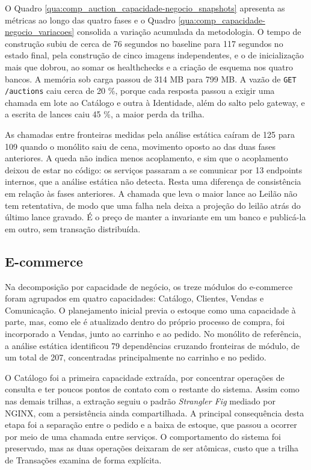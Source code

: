 O Quadro \ref{qua:comp_auction_capacidade-negocio_snapshots} apresenta as métricas ao longo das quatro fases e o Quadro \ref{qua:comp_capacidade-negocio_variacoes} consolida a variação acumulada da metodologia. O tempo de construção subiu de cerca de 76 segundos no baseline para 117 segundos no estado final, pela construção de cinco imagens independentes, e o de inicialização mais que dobrou, ao somar os healthchecks e a criação de esquema nos quatro bancos. A memória sob carga passou de 314 MB para 799 MB. A vazão de \texttt{GET /auctions} caiu cerca de 20 \%, porque cada resposta passou a exigir uma chamada em lote ao Catálogo e outra à Identidade, além do salto pelo gateway, e a escrita de lances caiu 45 \%, a maior perda da trilha.

As chamadas entre fronteiras medidas pela análise estática caíram de 125 para 109 quando o monólito saiu de cena, movimento oposto ao das duas fases anteriores. A queda não indica menos acoplamento, e sim que o acoplamento deixou de estar no código: os serviços passaram a se comunicar por 13 endpoints internos, que a análise estática não detecta. Resta uma diferença de consistência em relação às fases anteriores. A chamada que leva o maior lance ao Leilão não tem retentativa, de modo que uma falha nela deixa a projeção do leilão atrás do último lance gravado. É o preço de manter a invariante em um banco e publicá-la em outro, sem transação distribuída.



\subsection*{E-commerce}

Na decomposição por capacidade de negócio, os treze módulos do e-commerce foram agrupados em quatro capacidades: Catálogo, Clientes, Vendas e Comunicação. O planejamento inicial previa o estoque como uma capacidade à parte, mas, como ele é atualizado dentro do próprio processo de compra, foi incorporado a Vendas, junto ao carrinho e ao pedido. No monólito de referência, a análise estática identificou 79 dependências cruzando fronteiras de módulo, de um total de 207, concentradas principalmente no carrinho e no pedido.

O Catálogo foi a primeira capacidade extraída, por concentrar operações de consulta e ter poucos pontos de contato com o restante do sistema. Assim como nas demais trilhas, a extração seguiu o padrão \textit{Strangler Fig} mediado por NGINX, com a persistência ainda compartilhada. A principal consequência desta etapa foi a separação entre o pedido e a baixa de estoque, que passou a ocorrer por meio de uma chamada entre serviços. O comportamento do sistema foi preservado, mas as duas operações deixaram de ser atômicas, custo que a trilha de Transações examina de forma explícita.


